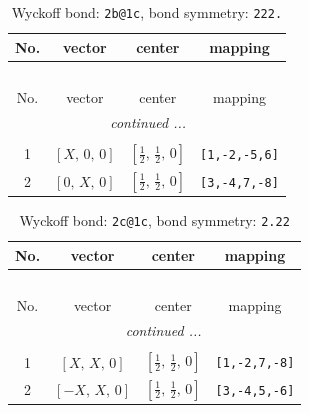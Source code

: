\documentclass[fleqn,8pt]{jsarticle}
\begin{document}
\renewcommand{\arraystretch}{1.2}
\begin{longtable}{cccc}
\caption{Wyckoff bond: {\tt 2b@1c}, bond symmetry: {\tt 222.}}
 \\
 \hline \hline
No. & vector & center & mapping \\ \hline \endfirsthead

\multicolumn{3}{l}{\tablename\ \thetable{}} \\
 \hline \hline
No. & vector & center & mapping \\ \hline \endhead

 \hline \hline
\multicolumn{3}{r}{\footnotesize\it continued ...} \\ \endfoot

 \hline \hline
\multicolumn{3}{r}{} \\ \endlastfoot

1 & $\left[ X,\, 0,\, 0 \right]$ & $\left[ \frac{1}{2},\, \frac{1}{2},\, 0 \right]$ & {\tt [1,-2,-5,6]} \\ \hline
2 & $\left[ 0,\, X,\, 0 \right]$ & $\left[ \frac{1}{2},\, \frac{1}{2},\, 0 \right]$ & {\tt [3,-4,7,-8]} \\
\end{longtable}
\renewcommand{\arraystretch}{1.2}
\begin{longtable}{cccc}
\caption{Wyckoff bond: {\tt 2c@1c}, bond symmetry: {\tt 2.22}}
 \\
 \hline \hline
No. & vector & center & mapping \\ \hline \endfirsthead

\multicolumn{3}{l}{\tablename\ \thetable{}} \\
 \hline \hline
No. & vector & center & mapping \\ \hline \endhead

 \hline \hline
\multicolumn{3}{r}{\footnotesize\it continued ...} \\ \endfoot

 \hline \hline
\multicolumn{3}{r}{} \\ \endlastfoot

1 & $\left[ X,\, X,\, 0 \right]$ & $\left[ \frac{1}{2},\, \frac{1}{2},\, 0 \right]$ & {\tt [1,-2,7,-8]} \\ \hline
2 & $\left[ - X,\, X,\, 0 \right]$ & $\left[ \frac{1}{2},\, \frac{1}{2},\, 0 \right]$ & {\tt [3,-4,5,-6]} \\
\end{longtable}
\renewcommand{\arraystretch}{1.2}
\end{document}
